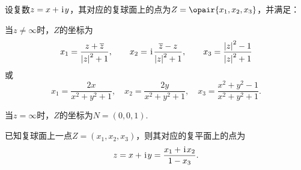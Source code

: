 \begin{theorem}
设复数\(z = x + \kern1pt\mathrm{i}\kern1pt y\)，其对应的复球面上的点为\(Z=\opair{x_1,x_2,x_3}\)，并满足：

当\(z \neq \infty\)时，\(Z\)的坐标为\begin{equation*}
	x_1 = \frac{z + \overline{z}}{\abs{z}^2 + 1}, \qquad
	x_2 = \kern1pt\mathrm{i}\kern1pt\frac{\overline{z} - z}{\abs{z}^2 + 1}, \qquad
	x_3 = \frac{\abs{z}^2 - 1}{\abs{z}^2 + 1}
\end{equation*}
或\begin{equation*}
	x_1 = \frac{2x}{x^2+y^2+1}, \quad
	x_2 = \frac{2y}{x^2+y^2+1}, \quad
	x_3 = \frac{x^2+y^2-1}{x^2+y^2+1}.
\end{equation*}

当\(z = \infty\)时，\(Z\)的坐标为\(N = (0,0,1)\).
\end{theorem}

\begin{theorem}
已知复球面上一点\(Z=(x_1,x_2,x_3)\)，则其对应的复平面上的点为\begin{equation*}
	z = x + \kern1pt\mathrm{i}\kern1pt y
	= \frac{x_1+\kern1pt\mathrm{i}\kern1pt x_2}{1-x_3}.
\end{equation*}
\end{theorem}
